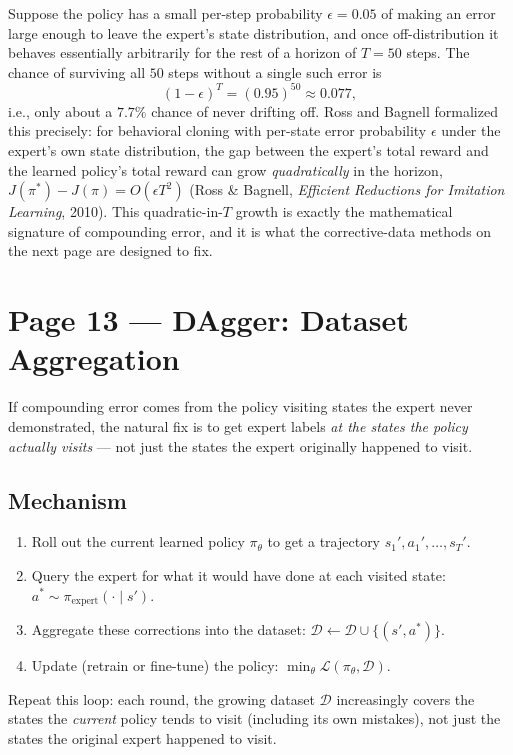 \documentclass[11pt]{article}
\begin{document}
Suppose the policy has a small per-step probability $\epsilon = 0.05$ of making an error large enough to leave the expert's state distribution, and once off-distribution it behaves essentially arbitrarily for the rest of a horizon of $T=50$ steps. The chance of surviving all $50$ steps without a single such error is
\[
(1-\epsilon)^T = (0.95)^{50} \approx 0.077,
\]
i.e., only about a $7.7\%$ chance of never drifting off. Ross and Bagnell formalized this precisely: for behavioral cloning with per-state error probability $\epsilon$ under the expert's own state distribution, the gap between the expert's total reward and the learned policy's total reward can grow \emph{quadratically} in the horizon, $J(\pi^*) - J(\pi) = O(\epsilon T^2)$ (Ross \& Bagnell, \emph{Efficient Reductions for Imitation Learning}, 2010). This quadratic-in-$T$ growth is exactly the mathematical signature of compounding error, and it is what the corrective-data methods on the next page are designed to fix.

\section*{Page 13 --- DAgger: Dataset Aggregation}

If compounding error comes from the policy visiting states the expert never demonstrated, the natural fix is to get expert labels \emph{at the states the policy actually visits} --- not just the states the expert originally happened to visit.

\subsection*{Mechanism}

\begin{enumerate}
\item Roll out the current learned policy $\pi_\theta$ to get a trajectory $s_1', a_1', \dots, s_T'$.
\item Query the expert for what it would have done at each visited state: $a^* \sim \pi_{\text{expert}}(\cdot \mid s')$.
\item Aggregate these corrections into the dataset: $\mathcal{D} \leftarrow \mathcal{D} \cup \{(s', a^*)\}$.
\item Update (retrain or fine-tune) the policy: $\min_\theta \mathcal{L}(\pi_\theta, \mathcal{D})$.
\end{enumerate}
Repeat this loop: each round, the growing dataset $\mathcal D$ increasingly covers the states the \emph{current} policy tends to visit (including its own mistakes), not just the states the original expert happened to visit.
\end{document}
